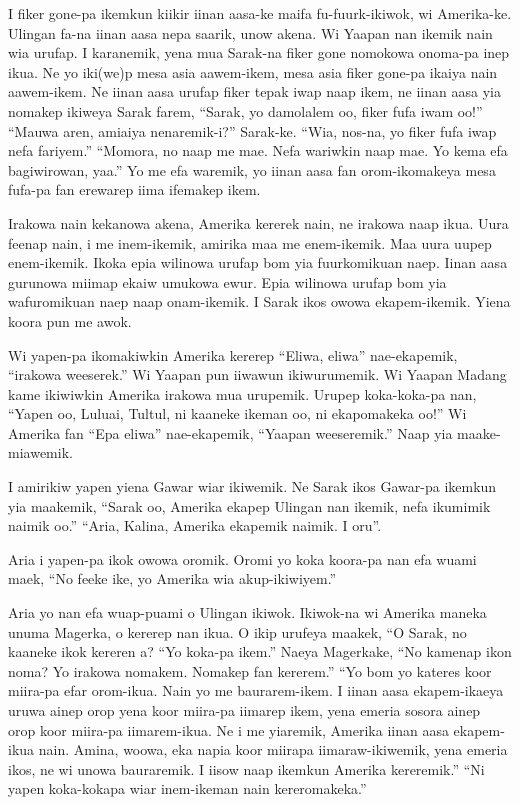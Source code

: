 I  fiker  gone-pa  ikemkun  kiikir  iinan  aasa-ke maifa  fu-fuurk-ikiwok,  wi  Amerika-ke. 
Ulingan  fa-na  iinan  aasa  nepa  saarik,  unow  akena. 
Wi  Yaapan  nan  ikemik  nain  wia  urufap. 
I  karanemik,  yena  mua  Sarak-na  fiker  gone  nomokowa  onoma-pa  inep  ikua. 
Ne  yo  iki(we)p  mesa  asia  aawem-ikem, mesa  asia  fiker  gone-pa  ikaiya  nain  aawem-ikem. 
Ne  iinan  aasa  urufap  fiker  tepak  iwap naap  ikem,  ne  iinan  aasa  yia  nomakep ikiweya  Sarak  farem,  “Sarak,  yo  damolalem oo,  fiker  fufa  iwam  oo!” 
“Mauwa  aren,  amiaiya  nenaremik-i?”  Sarak-ke. 
“Wia,  nos-na,  yo  fiker  fufa  iwap nefa  fariyem.” 
“Momora,  no  naap  me  mae. 
Nefa  wariwkin  naap  mae. 
Yo  kema  efa  bagiwirowan,  yaa.” 
Yo  me  efa  waremik,  yo  iinan  aasa  fan orom-ikomakeya  mesa  fufa-pa  fan  erewarep  iima  ifemakep  ikem. 

Irakowa  nain  kekanowa  akena,  Amerika  kererek  nain,  ne  irakowa  naap  ikua. 
Uura  feenap  nain,  i  me  inem-ikemik,  amirika maa  me  enem-ikemik. 
Maa  uura  uupep  enem-ikemik. 
Ikoka  epia  wilinowa  urufap  bom  yia   fuurkomikuan  naep. 
Iinan  aasa  gurunowa  miimap  ekaiw   umukowa  ewur. 
Epia  wilinowa  urufap  bom  yia  wafuromikuan  naep  naap  onam-ikemik. 
I  Sarak  ikos  owowa  ekapem-ikemik. 
Yiena  koora  pun  me  awok. 

Wi  yapen-pa  ikomakiwkin  Amerika  kererep  “Eliwa,  eliwa”  nae-ekapemik,  “irakowa  weeserek.” 
Wi  Yaapan  pun  iiwawun  ikiwurumemik. 
Wi  Yaapan  Madang  kame  ikiwiwkin  Amerika  irakowa mua  urupemik. 
Urupep  koka-koka-pa  nan,  “Yapen  oo,  Luluai,  Tultul,   ni  kaaneke  ikeman  oo,  ni  ekapomakeka  oo!” 
Wi  Amerika  fan  “Epa  eliwa”  nae-ekapemik,  “Yaapan  weeseremik.” 
Naap  yia  maake-miawemik. 

I  amirikiw  yapen  yiena  Gawar  wiar ikiwemik. 
Ne  Sarak  ikos  Gawar-pa  ikemkun  yia  maakemik,  “Sarak  oo,  Amerika  ekapep  Ulingan  nan  ikemik, nefa  ikumimik  naimik  oo.” 
“Aria,  Kalina,  Amerika  ekapemik  naimik. 
I  oru”. 

Aria  i  yapen-pa  ikok  owowa  oromik. 
Oromi  yo  koka  koora-pa  nan  efa  wuami  maek,  “No  feeke  ike,  yo  Amerika  wia  akup-ikiwiyem.” 

Aria  yo  nan  efa  wuap-puami o  Ulingan  ikiwok. 
Ikiwok-na  wi  Amerika  maneka  unuma  Magerka,  o  kererep  nan  ikua. 
O  ikip  urufeya  maakek,  “O  Sarak,  no    kaaneke  ikok  kereren  a? 
“Yo  koka-pa  ikem.” 
Naeya  Magerkake,  “No  kamenap  ikon  noma? 
Yo  irakowa  nomakem. 
Nomakep  fan  kererem.” 
“Yo  bom  yo  kateres  koor  miira-pa  efar orom-ikua. 
Nain  yo  me  baurarem-ikem. 
I  iinan  aasa  ekapem-ikaeya  uruwa  ainep orop  yena  koor  miira-pa  iimarep  ikem,  yena  emeria  sosora  ainep  orop  koor  miira-pa  iimarem-ikua. 
Ne  i  me  yiaremik,  Amerika  iinan  aasa  ekapem-ikua  nain. 
Amina,  woowa,  eka  napia  koor  miirapa  iimaraw-ikiwemik,  yena  emeria  ikos,  ne  wi  unowa  bauraremik. 
I  iisow  naap  ikemkun  Amerika  kereremik.” 
“Ni  yapen  koka-kokapa  wiar  inem-ikeman nain  kereromakeka.” 

